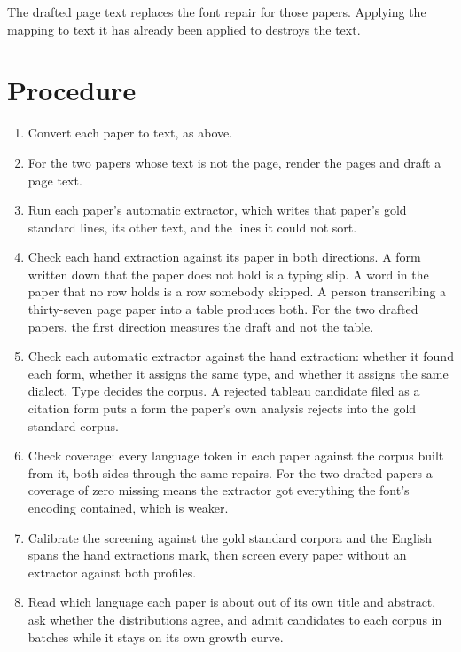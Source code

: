 The drafted page text replaces the font repair for those papers. Applying the mapping to text it has
already been applied to destroys the text.

\section{Procedure}

\begin{enumerate}
  \item Convert each paper to text, as above.
  \item For the two papers whose text is not the page, render the pages and draft a page text.
  \item Run each paper's automatic extractor, which writes that paper's gold standard lines, its
        other text, and the lines it could not sort.
  \item Check each hand extraction against its paper in both directions. A form written down that
        the paper does not hold is a typing slip. A word in the paper that no row holds is a row
        somebody skipped. A person transcribing a thirty-seven page paper into a table produces
        both. For the two drafted papers, the first direction measures the draft and not the table.
  \item Check each automatic extractor against the hand extraction: whether it found each form,
        whether it assigns the same type, and whether it assigns the same dialect. Type decides the
        corpus. A rejected tableau candidate filed as a citation form puts a form the paper's own
        analysis rejects into the gold standard corpus.
  \item Check coverage: every language token in each paper against the corpus built from it, both
        sides through the same repairs. For the two drafted papers a coverage of zero missing means
        the extractor got everything the font's encoding contained, which is weaker.
  \item Calibrate the screening against the gold standard corpora and the English spans the hand
        extractions mark, then screen every paper without an extractor against both profiles.
  \item Read which language each paper is about out of its own title and abstract, ask whether the
        distributions agree, and admit candidates to each corpus in batches while it stays on its
        own growth curve.
\end{enumerate}

